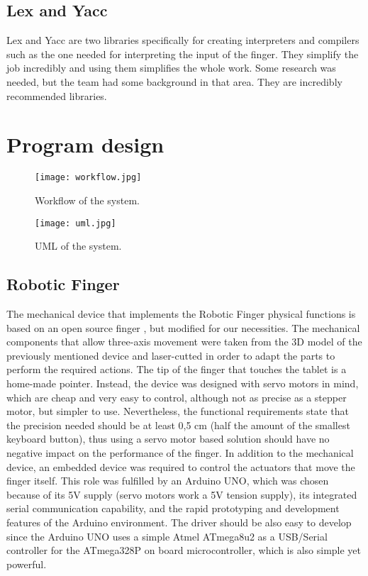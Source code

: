 \documentclass[12pt]{article}
\begin{document}
\subsection{Lex and Yacc}
Lex and Yacc are two libraries specifically for creating interpreters and compilers such as the one needed for interpreting the input of the finger. They simplify the job incredibly and using them simplifies the whole work. Some research was needed, but the team had some background in that area. They are incredibly recommended libraries.

\section{Program design}

\begin{figure}[H]
\centering
\texttt{[image: workflow.jpg]}
\caption{Workflow of the system.}
\end{figure}

\begin{figure}[H]
\centering
\texttt{[image: uml.jpg]}
\caption{UML of the system.}
\end{figure}

\subsection{Robotic Finger}
The mechanical device that implements the Robotic Finger physical functions is based on an open source finger \cite{finger}, but modified for our necessities. The mechanical components that allow three-axis movement were taken from the 3D model of the previously mentioned device and laser-cutted in order to adapt the parts to perform the required actions. The tip of the finger that touches the tablet is a home-made pointer. Instead, the device was designed with servo motors in mind, which are cheap and very easy to control, although not as precise as a stepper motor, but simpler to use. Nevertheless, the functional requirements state that the precision needed should be at least 0,5 cm (half the amount of the smallest keyboard button), thus using a servo motor based solution should have no negative impact on the performance of the finger. In addition to the mechanical device, an embedded device was required to control the actuators that move the finger itself. This role was fulfilled by an Arduino UNO, which was chosen because of its 5V supply (servo motors work a 5V tension supply), its integrated serial communication capability, and the rapid prototyping and development features of the Arduino environment. The driver should be also easy to develop since the Arduino UNO uses a simple Atmel ATmega8u2 as a USB/Serial controller for the ATmega328P on board microcontroller, which is also simple yet powerful.
\end{document}

